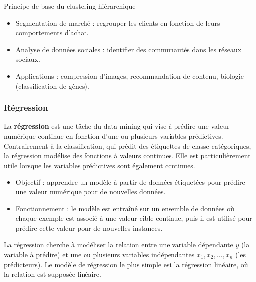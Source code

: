 \documentclass[a4paper,12pt]{article}
\begin{document}
        Principe de base du clustering hiérarchique
        

        
        \begin{itemize}
            \item  Segmentation de marché : regrouper les clients en fonction de leurs comportements d’achat.
            \item  Analyse de données sociales : identifier des communautés dans les réseaux sociaux.
            \item  Applications : compression d’images, recommandation de contenu, biologie (classification de gènes).
        \end{itemize}
        
        
      
      \subsubsection{Régression}

La \textbf{régression} est une tâche du data mining qui vise à prédire une valeur numérique continue en fonction d'une ou plusieurs variables prédictives. Contrairement à la classification, qui prédit des étiquettes de classe catégoriques, la régression modélise des fonctions à valeurs continues. Elle est particulièrement utile lorsque les variables prédictives sont également continues.


\begin{itemize}
    \item  Objectif : apprendre un modèle à partir de données étiquetées pour prédire une valeur numérique pour de nouvelles données.
    \item  Fonctionnement : le modèle est entraîné sur un ensemble de données où chaque exemple est associé à une valeur cible continue, puis il est utilisé pour prédire cette valeur pour de nouvelles instances.
\end{itemize}

La régression cherche à modéliser la relation entre une variable dépendante \( y \) (la variable à prédire) et une ou plusieurs variables indépendantes \( x_1, x_2, \dots, x_n \) (les prédicteurs). Le modèle de régression le plus simple est la régression linéaire, où la relation est supposée linéaire.
\end{document}
